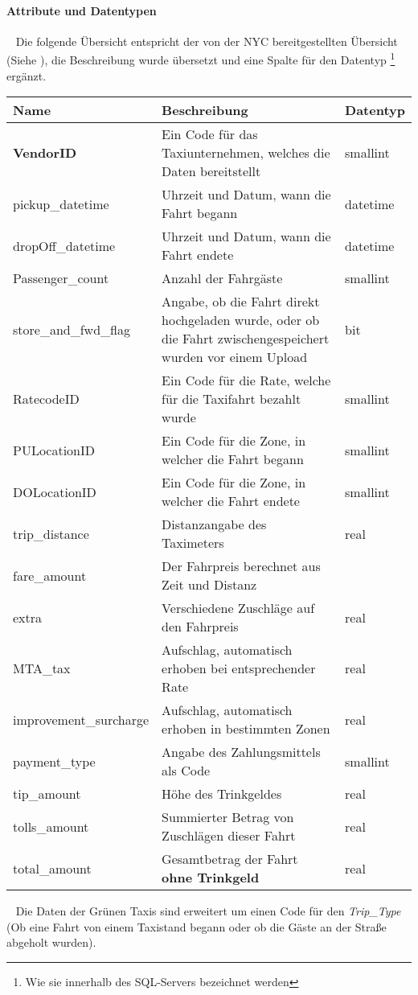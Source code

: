 \paragraph{Attribute und Datentypen} ~\newline
Die folgende Übersicht entspricht der von der NYC bereitgestellten Übersicht (Siehe \cite{DataDicYellow}), die Beschreibung wurde übersetzt und eine Spalte für den Datentyp \footnote{Wie sie innerhalb des SQL-Servers bezeichnet werden} ergänzt. 
~\newline
\begin{center}
	\begin{tabular}{|p{}|p{}|p{}|}
		\hline
		Name & Beschreibung & Datentyp  \\ \hline
		\textbf{VendorID} & Ein Code für das Taxiunternehmen, welches die Daten bereitstellt & smallint \\ \hline
		pickup\_datetime & Uhrzeit und Datum, wann die Fahrt begann & datetime \\ \hline
		dropOff\_datetime & Uhrzeit und Datum, wann die Fahrt endete & datetime \\ \hline
		Passenger\_count & Anzahl der Fahrgäste & smallint \\ \hline	
		store\_and\_fwd\_flag & Angabe, ob die Fahrt direkt hochgeladen wurde, oder ob die Fahrt zwischengespeichert wurden vor einem Upload & bit \\ \hline
		RatecodeID & Ein Code für die Rate, welche für die Taxifahrt bezahlt wurde & smallint \\ \hline
		PULocationID & Ein Code für die Zone, in welcher die Fahrt begann & smallint \\ \hline
		DOLocationID & Ein Code für die Zone, in welcher die Fahrt endete & smallint \\ \hline
		trip\_distance & Distanzangabe des Taximeters & real \\ \hline
		fare\_amount & Der Fahrpreis berechnet aus Zeit und Distanz & \\ \hline
		extra & Verschiedene Zuschläge auf den Fahrpreis & real \\ \hline 
		MTA\_tax & Aufschlag, automatisch erhoben bei entsprechender Rate& real \\ \hline
		improvement\_surcharge & Aufschlag, automatisch erhoben in bestimmten Zonen & real \\ \hline
		payment\_type & Angabe des Zahlungsmittels als Code & smallint \\ \hline 
		tip\_amount & Höhe des Trinkgeldes & real \\ \hline
		tolls\_amount & Summierter Betrag von Zuschlägen dieser Fahrt& real \\ \hline
		total\_amount & Gesamtbetrag der Fahrt \textbf{ohne Trinkgeld} & real \\ \hline 
	\end{tabular}
\end{center}
~\newline
Die Daten der Grünen Taxis sind erweitert um einen Code für den \textit{Trip\_Type} (Ob eine Fahrt von einem Taxistand begann oder ob die Gäste an der Straße abgeholt wurden).


